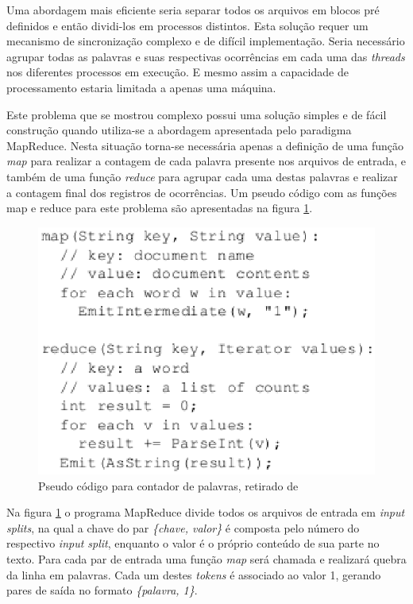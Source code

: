 Uma abordagem mais eficiente seria separar todos os arquivos em blocos pré definidos e então dividi-los em processos distintos. Esta solução requer um mecanismo de sincronização complexo e de difícil implementação. Seria necessário agrupar todas as palavras e suas respectivas ocorrências em cada uma das \textit{threads} nos diferentes processos em execução. E mesmo assim a capacidade de processamento estaria limitada a apenas uma máquina.

Este problema que se mostrou complexo possui uma solução simples e de fácil construção quando utiliza-se a abordagem apresentada pelo paradigma MapReduce. Nesta situação torna-se necessária apenas a definição de uma função \textit{map} para realizar a contagem de cada palavra presente nos arquivos de entrada, e também de uma função \textit{reduce} para agrupar cada uma destas palavras e realizar a contagem final dos registros de ocorrências. Um pseudo código com as funções map e reduce para este problema são apresentadas na figura \ref{fig-mapreduce-google-code}.

\begin{figure}[ht!]
	\centering
	\includegraphics[keepaspectratio=true,scale=0.8]
	  {figuras/mapreduce-google-code.eps}
	\caption{Pseudo código para contador de palavras, retirado de \cite{ghemawatMapreduce2008}}
	\label{fig-mapreduce-google-code}
\end{figure}

Na figura \ref{fig-mapreduce-google-code} o programa MapReduce divide todos os arquivos de entrada em \textit{input splits}, na qual a chave do par \textit{\{chave, valor\}} é composta pelo número do respectivo \textit{input split}, enquanto o valor é o próprio conteúdo de sua parte no texto. Para cada par de entrada uma função \textit{map} será chamada e realizará quebra da linha em palavras. Cada um destes \textit{tokens} é associado ao valor 1, gerando pares de saída no formato \textit{\{palavra, 1\}}.

